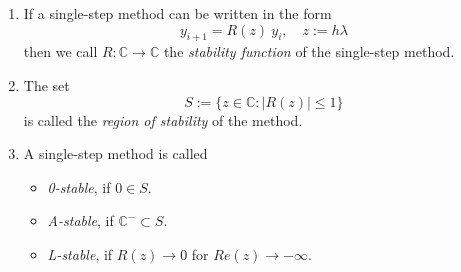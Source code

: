 		\begin{definition}
			\begin{enumerate}
				\item 
				If a single-step method can be written in the form
				\begin{equation}
					y_{i+1} = R(z) \ y_i, \quad z:= h \lambda
				\end{equation}
				then we call $R: \mathbb{C} \to \mathbb{C}$ the \emph{stability function} of the single-step method.
				\item 
				The set
				\begin{equation}
					S := \{z \in \mathbb{C} : |R(z)| \leq 1\}
				\end{equation}
				is called the \emph{region of stability} of the method.
				\item 
				A single-step method is called
				\begin{itemize}
					\item \emph{0-stable}, if $0 \in S$.
					\item \emph{A-stable}, if $\mathbb{C}^- \subset S$.
					\item \emph{L-stable}, if $R(z) \to 0$ for $Re(z) \to -\infty$.
				\end{itemize}
			\end{enumerate}
		\end{definition}

		
		
		
